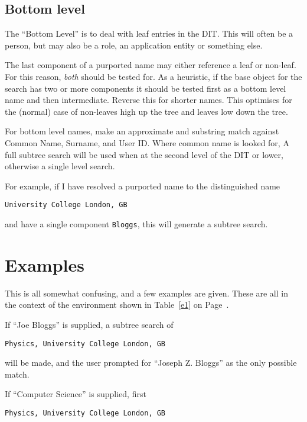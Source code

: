 \subsection {Bottom level}

The ``Bottom Level'' is to deal with leaf entries in the DIT.  This will
often be a person, but may also be a role, an application entity or
something else.  

The last component of a purported name may either reference a leaf or
non-leaf.  For this reason, {\em both} should be tested for.
As a heuristic, if the base object for the search  has two or more
components it should be tested first as a bottom level name and then
intermediate.  Reverse this for shorter names.  This optimises for the
(normal) case
of non-leaves high up the tree and leaves low down the tree.

For bottom level names, make an
approximate and substring match against Common Name, Surname, and User ID.
Where common name is looked for, 
A full subtree search will be used when at
the second level of the DIT or lower, otherwise a single level search.

For example, if I have resolved a purported name to the distinguished name

\begin{verbatim}
University College London, GB
\end{verbatim}

and have a single component \verb|Bloggs|, this will generate a subtree
search.

\section{Examples}


This is all somewhat confusing, and a few examples are given.  These are all
in the context of the environment shown in Table~\ref{e1} on
Page~\pageref{e1}.

If ``Joe Bloggs'' is supplied, a subtree search of 

\begin{verbatim}
Physics, University College London, GB
\end{verbatim}

will be made, and the user prompted for ``Joseph Z. Bloggs'' as the only
possible match.

If ``Computer Science'' is supplied, first 

\begin{verbatim}
Physics, University College London, GB
\end{verbatim}

